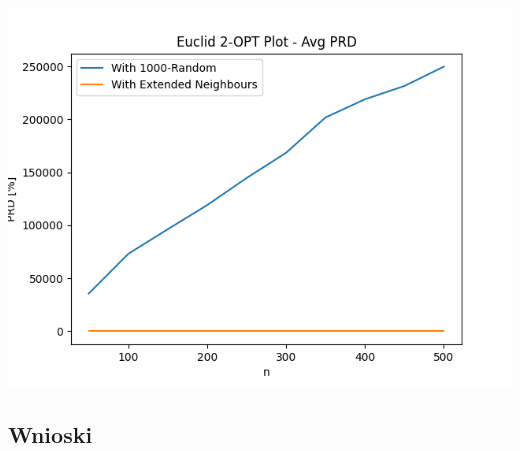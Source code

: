 \documentclass{article}
\begin{document}
\begin{center}
\includegraphics[width=\textwidth, 
                   height = 0.4\textheight, 
                   keepaspectratio]
                  {two_opt_euclid_avg_prd} 
\end{center}
                  
\subsection{Wnioski}
\end{document}
